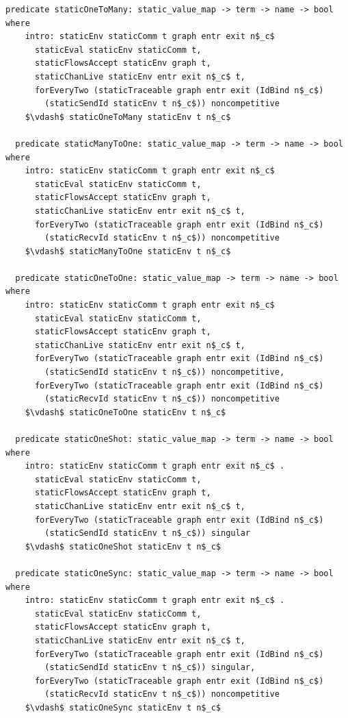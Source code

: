 \documentclass[letterpaper, 11pt]{report}
\begin{document}
\begin{lstlisting}[language=logic, mathescape]
  predicate staticOneToMany: static_value_map -> term -> name -> bool where
    intro: staticEnv staticComm t graph entr exit n$_c$ 
      staticEval staticEnv staticComm t,
      staticFlowsAccept staticEnv graph t,
      staticChanLive staticEnv entr exit n$_c$ t, 
      forEveryTwo (staticTraceable graph entr exit (IdBind n$_c$)
        (staticSendId staticEnv t n$_c$)) noncompetitive
    $\vdash$ staticOneToMany staticEnv t n$_c$

  predicate staticManyToOne: static_value_map -> term -> name -> bool where
    intro: staticEnv staticComm t graph entr exit n$_c$ 
      staticEval staticEnv staticComm t,
      staticFlowsAccept staticEnv graph t,
      staticChanLive staticEnv entr exit n$_c$ t, 
      forEveryTwo (staticTraceable graph entr exit (IdBind n$_c$)
        (staticRecvId staticEnv t n$_c$)) noncompetitive
    $\vdash$ staticManyToOne staticEnv t n$_c$

  predicate staticOneToOne: static_value_map -> term -> name -> bool where
    intro: staticEnv staticComm t graph entr exit n$_c$ 
      staticEval staticEnv staticComm t,
      staticFlowsAccept staticEnv graph t,
      staticChanLive staticEnv entr exit n$_c$ t, 
      forEveryTwo (staticTraceable graph entr exit (IdBind n$_c$) 
        (staticSendId staticEnv t n$_c$)) noncompetitive, 
      forEveryTwo (staticTraceable graph entr exit (IdBind n$_c$)
        (staticRecvId staticEnv t n$_c$)) noncompetitive
    $\vdash$ staticOneToOne staticEnv t n$_c$

  predicate staticOneShot: static_value_map -> term -> name -> bool where
    intro: staticEnv staticComm t graph entr exit n$_c$ . 
      staticEval staticEnv staticComm t,
      staticFlowsAccept staticEnv graph t,
      staticChanLive staticEnv entr exit n$_c$ t, 
      forEveryTwo (staticTraceable graph entr exit (IdBind n$_c$)
        (staticSendId staticEnv t n$_c$)) singular
    $\vdash$ staticOneShot staticEnv t n$_c$

  predicate staticOneSync: static_value_map -> term -> name -> bool where
    intro: staticEnv staticComm t graph entr exit n$_c$ . 
      staticEval staticEnv staticComm t,
      staticFlowsAccept staticEnv graph t,
      staticChanLive staticEnv entr exit n$_c$ t, 
      forEveryTwo (staticTraceable graph entr exit (IdBind n$_c$)
        (staticSendId staticEnv t n$_c$)) singular,
      forEveryTwo (staticTraceable graph entr exit (IdBind n$_c$)
        (staticRecvId staticEnv t n$_c$)) noncompetitive 
    $\vdash$ staticOneSync staticEnv t n$_c$
  \end{lstlisting}
\end{document}

